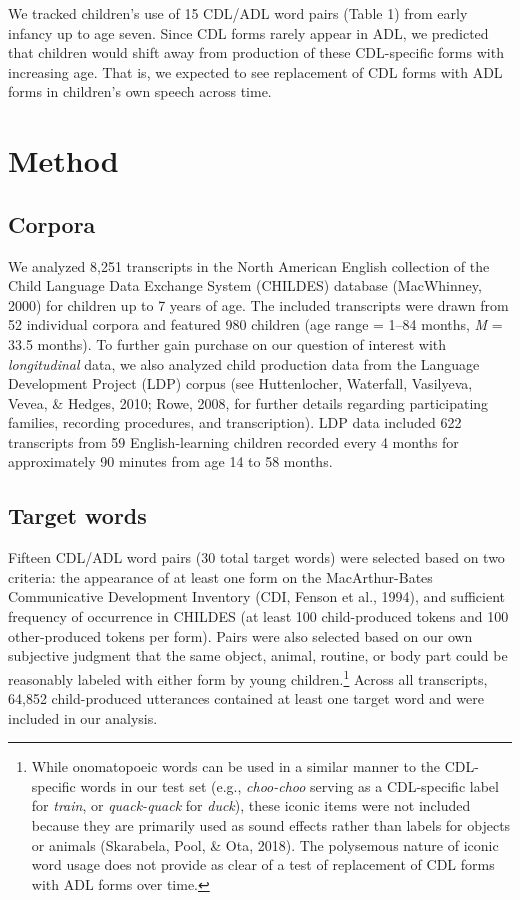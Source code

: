 \documentclass[10pt, letterpaper]{article}
\begin{document}
We tracked children's use of 15 CDL/ADL word pairs (Table 1) from early
infancy up to age seven. Since CDL forms rarely appear in ADL, we
predicted that children would shift away from production of these
CDL-specific forms with increasing age. That is, we expected to see
replacement of CDL forms with ADL forms in children's own speech across
time.

\hypertarget{method}{%
\section{Method}\label{method}}

\hypertarget{corpora}{%
\subsection{Corpora}\label{corpora}}

We analyzed 8,251 transcripts in the North American English collection
of the Child Language Data Exchange System (CHILDES) database
(MacWhinney, 2000) for children up to 7 years of age. The included
transcripts were drawn from 52 individual corpora and featured 980
children (age range = 1--84 months, \emph{M} = 33.5 months). To further
gain purchase on our question of interest with \emph{longitudinal} data,
we also analyzed child production data from the Language Development
Project (LDP) corpus (see Huttenlocher, Waterfall, Vasilyeva, Vevea, \&
Hedges, 2010; Rowe, 2008, for further details regarding participating
families, recording procedures, and transcription). LDP data included
622 transcripts from 59 English-learning children recorded every 4
months for approximately 90 minutes from age 14 to 58 months.

\hypertarget{target-words}{%
\subsection{Target words}\label{target-words}}

Fifteen CDL/ADL word pairs (30 total target words) were selected based
on two criteria: the appearance of at least one form on the
MacArthur-Bates Communicative Development Inventory (CDI, Fenson et al.,
1994), and sufficient frequency of occurrence in CHILDES (at least 100
child-produced tokens and 100 other-produced tokens per form). Pairs
were also selected based on our own subjective judgment that the same
object, animal, routine, or body part could be reasonably labeled with
either form by young children.\footnote{While onomatopoeic words can be
  used in a similar manner to the CDL-specific words in our test set
  (e.g., \emph{choo-choo} serving as a CDL-specific label for
  \emph{train}, or \emph{quack-quack} for \emph{duck}), these iconic
  items were not included because they are primarily used as sound
  effects rather than labels for objects or animals (Skarabela, Pool, \&
  Ota, 2018). The polysemous nature of iconic word usage does not
  provide as clear of a test of replacement of CDL forms with ADL forms
  over time.} Across all transcripts, 64,852 child-produced utterances
contained at least one target word and were included in our analysis.
\end{document}
